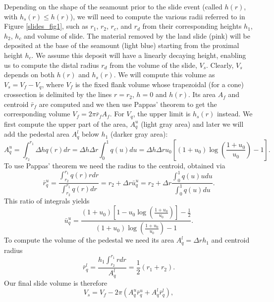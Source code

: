 \documentclass[12pt,letterpaper,margin=0.5in]{report}
\begin{document}
Depending on the shape of the seamount prior to the slide event (called $h(r)$, with $h_s(r) \le h(r)$), we will need to compute the various radii referred
to in Figure \ref{slides_fig1}, such as $r_1$, $r_2$, $r_c$, and $r_d$ from their corresponding heights $h_1$, $h_2$, $h_c$ and volume of slide.
The material removed by the land slide (pink)
will be deposited at the base of the seamount (light blue) starting from the proximal height $h_c$.  We assume this deposit will have a linearly
decaying height, enabling us to compute the distal radius $r_d$ from the volume of the slide, $V_s$.  Clearly, $V_s$ depends
on both $h(r)$ and $h_s(r)$.  We will compute this volume as $V_s = V_f - V_q$, where $V_f$ is the fixed flank volume whose
trapezoidal (for a cone) crossection is delimited by the lines $r = r_2$, $h = 0$ and $h(r)$.  Its area $A_f$ and centroid $\bar{r}_f$ are computed and
we then use Pappas' theorem to get the corresponding volume $V_f = 2 \pi \bar{r}_f A_f$.  For $V_q$, the upper limit is $h_s(r)$ instead. We first compute the upper part of the area, $A^u_q$ (light gray area)
and later we will add the pedestal area $A^l_q$ below $h_1$ (darker gray area):
\begin{equation}
A^u_q = \int_{r_2}^{r_1} \Delta h q(r) dr = \Delta h \Delta r \int_0^1 q(u) du = \Delta h \Delta r u_0 \left [ (1 + u_0) \log \left (\frac{1 + u_0}{u_0} \right ) - 1 \right ].
\end{equation}
To use Pappas' theorem we need the radius to the centroid, obtained via
\begin{equation}
\bar{r}^u_q = \frac{\int_{r_2}^{r_1}q(r)rdr}{\int_{r_2}^{r_1}q(r)dr} = r_2 + \Delta r \bar{u}_q^u = r_2 + \Delta r \frac{\int_0^1q(u)udu}{\int_0^1 q(u)du}.
\end{equation}
This ratio of integrals yields
\begin{equation}
\bar{u}^u_q = \frac{(1 + u_0)\left [1 - u_0 \log \left ( \frac{1+u_0}{u_0} \right ) \right ] - \frac{1}{2}}{(1 + u_0) \log \left (\frac{1 + u_0}{u_0} \right ) - 1}.
\end{equation}
To compute the volume of the pedestal we need its area $A^l_q = \Delta r h_1$ and centroid radius
\begin{equation}
\bar{r}^l_q = \frac{ h_1\int_{r_2}^{r_1} rdr}{A^l_q} = \frac{1}{2} (r_1 + r_2).
\end{equation}
Our final slide volume is therefore
\begin{equation}
V_s = V_f - 2 \pi \left (A^u_q \bar{r}^u_q + A^l_q \bar{r}^l_q \right ),
\end{equation}
\end{document}
